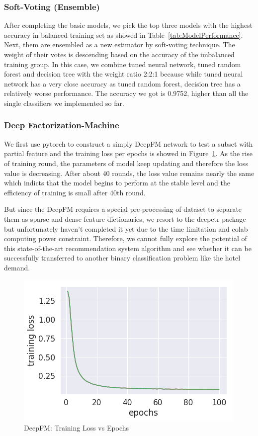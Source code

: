 \documentclass[10pt,twocolumn,letterpaper]{article}
\begin{document}
\subsubsection{Soft-Voting (Ensemble)}
After completing the basic models, we pick the top three models with the highest accuracy in balanced training set as showed in Table~\ref{tab:ModelPerformance}. Next, them are ensembled as a new estimator by soft-voting technique. The weight of their votes is descending based on the accuracy of the imbalanced training group. In this case, we combine tuned neural network, tuned random forest and decision tree with the weight ratio 2:2:1 because while tuned neural network has a very close accuracy as tuned random forest, decision tree has a relatively worse performance. The accuracy we got is 0.9752, higher than all the single classifiers we implemented so far.


\subsubsection{Deep Factorization-Machine}
We first use pytorch to construct a simply DeepFM network to test a subset with partial feature and the training loss per epochs is showed in Figure~\ref{fig:DeepFMLoss}. As the rise of training round, the parameters of model keep updating and therefore the loss value is decreasing. After about 40 rounds, the loss value remains nearly the same which indicts that the model begins to perform at the stable level and the efficiency of training is small after 40th round.

But since the DeepFM requires a special pre-processing of dataset to separate them as sparse and dense feature dictionaries, we resort to the deepctr package but unfortunately haven't completed it yet due to the time limitation and colab computing power constraint. Therefore, we cannot fully explore the potential of this state-of-the-art recommendation system algorithm and see whether it can be successfully transferred to another binary classification problem like the hotel demand.

\begin{figure}[H]
\begin{center}
    \includegraphics[width=0.8\linewidth]{images/DeepFM_Train_Loss.png}
\end{center}
   \caption{DeepFM: Training Loss vs Epochs}
\label{fig:DeepFMLoss}
\end{figure}
\end{document}
